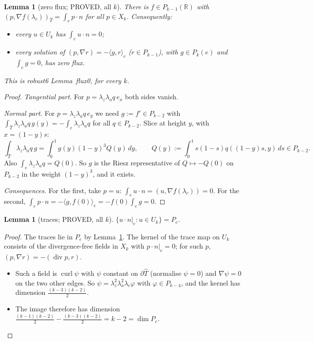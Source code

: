 \documentclass[11pt]{article}
\newtheorem{lemma}[theorem]{Lemma}
\theoremstyle{remark}
\newcommand{\ip}[2]{\langle #1,#2\rangle}
\begin{document}
\begin{lemma}[zero flux; PROVED, all $k$]\label{lem:flux}
There is $f\in P_{k-1}(\mathbb R)$ with $(p,\nabla f(\lambda_c))_{\hat T}=\int_ep\cdot n$ for all $p\in X_k$. Consequently:
\begin{itemize}
\item every $u\in U_k$ has $\int_eu\cdot n=0$;
\item every solution of $(p,\nabla r)=-\ip gr_e$ ($r\in P_{k-1}$), with $g\in P_k(e)$ and $\int_eg=0$, has zero flux.
\end{itemize}
This is robust6 Lemma~flux0, for every $k$.
\end{lemma}
\begin{proof}
\emph{Tangential part.} For $p=\lambda_z\lambda_aq\,e_x$ both sides vanish.

\emph{Normal part.} For $p=\lambda_z\lambda_aq\,e_y$ we need $g:=f'\in P_{k-2}$ with $\int_{\hat T}\lambda_z\lambda_aq\,g(y)=-\int_e\lambda_z\lambda_aq$ for all $q\in P_{k-2}$.
Slice at height $y$, with $x=(1-y)s$:
\[
\int_{\hat T}\lambda_z\lambda_aq\,g=\int_0^1g(y)(1-y)^3Q(y)\,dy,\qquad Q(y):=\int_0^1s(1-s)q((1-y)s,y)\,ds\in P_{k-2}.
\]
Also $\int_e\lambda_z\lambda_aq=Q(0)$. So $g$ is the Riesz representative of $Q\mapsto-Q(0)$ on $P_{k-2}$ in the weight $(1-y)^3$, and it exists.

\emph{Consequences.} For the first, take $p=u$: $\int_eu\cdot n=(u,\nabla f(\lambda_c))=0$. For the second, $\int_ep\cdot n=-\ip g{f(0)}_e=-f(0)\int_eg=0$.
\end{proof}

\begin{lemma}[traces; PROVED, all $k$]\label{lem:tr}
$\{u\cdot n|_e:u\in U_k\}=P_e$.
\end{lemma}
\begin{proof}
The traces lie in $P_e$ by Lemma~\ref{lem:flux}. The kernel of the trace map on $U_k$ consists of the divergence-free fields in $X_k$ with $p\cdot n|_e=0$; for such $p$,
$(p,\nabla r)=-(\operatorname{div}p,r)$.
\begin{itemize}
\item Such a field is $\operatorname{curl}\psi$ with $\psi$ constant on $\partial\hat T$ (normalise $\psi=0$) and $\nabla\psi=0$ on the two other edges.
So $\psi=\lambda_z^2\lambda_a^2\lambda_c\varphi$ with $\varphi\in P_{k-4}$, and the kernel has dimension $\frac{(k-3)(k-2)}2$.
\item The image therefore has dimension $\frac{(k-1)(k-2)}2-\frac{(k-3)(k-2)}2=k-2=\dim P_e$.
\end{itemize}
\end{proof}
\end{document}
